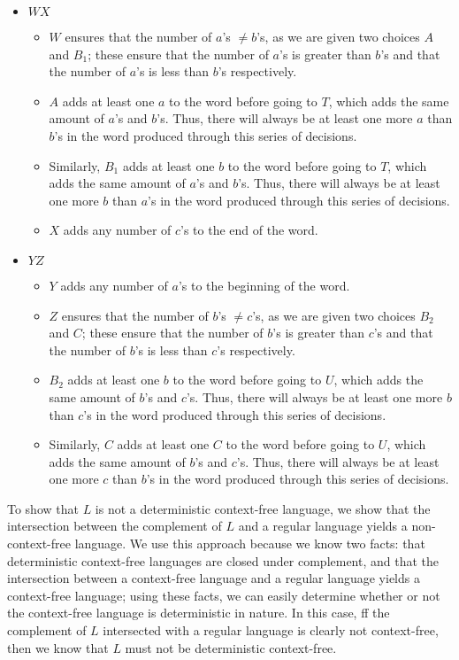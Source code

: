 \documentclass{article}
\begin{document}
\begin{itemize}
    \item \(WX\)
    \begin{itemize}
        \item \(W\) ensures that the number of \(a\)'s \(\neq b\)'s, as we are given two choices \(A\) and \(B_1\); these ensure that the number of \(a\)'s is greater than \(b\)'s and that the number of \(a\)'s is less than \(b\)'s respectively.
        \item \(A\) adds at least one \(a\) to the word before going to \(T\), which adds the same amount of \(a\)'s and \(b\)'s. Thus, there will always be at least one more \(a\) than \(b\)'s in the word produced through this series of decisions.
        \item Similarly, \(B_1\) adds at least one \(b\) to the word before going to \(T\), which adds the same amount of \(a\)'s and \(b\)'s. Thus, there will always be at least one more \(b\) than \(a\)'s in the word produced through this series of decisions.
        \item \(X\) adds any number of \(c\)'s to the end of the word.
    \end{itemize}
    \item \(YZ\)
    \begin{itemize}
        \item \(Y\) adds any number of \(a\)'s to the beginning of the word.
        \item \(Z\) ensures that the number of \(b\)'s \(\neq c\)'s, as we are given two choices \(B_2\) and \(C\); these ensure that the number of \(b\)'s is greater than \(c\)'s and that the number of \(b\)'s is less than \(c\)'s respectively.
        \item \(B_2\) adds at least one \(b\) to the word before going to \(U\), which adds the same amount of \(b\)'s and \(c\)'s. Thus, there will always be at least one more \(b\) than \(c\)'s in the word produced through this series of decisions.
        \item Similarly, \(C\) adds at least one \(C\) to the word before going to \(U\), which adds the same amount of \(b\)'s and \(c\)'s. Thus, there will always be at least one more \(c\) than \(b\)'s in the word produced through this series of decisions.
    \end{itemize}
\end{itemize}
To show that \(L\) is not a deterministic context-free language, we show that the intersection between the complement of \(L\) and a regular language yields a non-context-free language. We use this approach because we know two facts: that deterministic context-free languages are closed under complement, and that the intersection between a context-free language and a regular language yields a context-free language;  using these facts, we can easily determine whether or not the context-free language is deterministic in nature. In this case, ff the complement of \(L\) intersected with a regular language is clearly not context-free, then we know that \(L\) must not be deterministic context-free.
\end{document}
